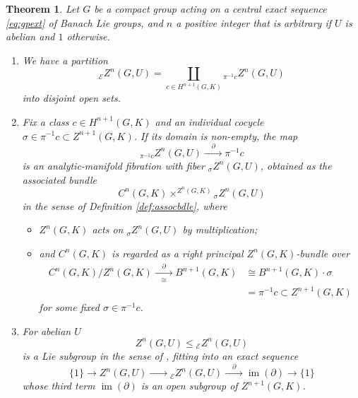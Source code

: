 \documentclass[10pt,a4paper]{amsart}
\numberwithin{equation}{section}
\newtheorem{Theorem}{Theorem}[section]
\newcommand\cE{{\mathcal E}}
\DeclareMathOperator{\im}{\mathrm{im}}
\begin{document}
\begin{Theorem}\label{th:relcocfiber}
 Let $G$ be a compact group acting on a central exact sequence \eqref{eq:gpext} of Banach Lie groups, and $n$ a positive integer that is arbitrary if $U$ is abelian and $1$ otherwise.
 \begin{enumerate}[$(1)$]\itemsep=0pt
 \item\label{item:relcocfiber1} We have a partition
 \begin{equation*}
 {}_{\cE}Z^n(G,U) = \coprod_{c\in H^{n+1}(G,K)}{}_{\pi^{-1}c} Z^n(G,U)
 \end{equation*}
 into disjoint open sets.
 \item\label{item:relcocfiber2} Fix a class $c\in H^{n+1}(G,K)$ and an individual cocycle $\sigma\in \pi^{-1}c\subset Z^{n+1}(G,K)$. If its domain is non-empty, the map
 \begin{equation}\label{eq:relznfibers}
 {}_{\pi^{-1}c}Z^n(G,U)\xrightarrow{\quad\partial\quad}\pi^{-1}c
 \end{equation}
 is an analytic-manifold fibration with fiber ${}_{\sigma}Z^n(G,U)$, obtained as the associated bundle
 \begin{equation*}
 C^{n}(G,K)\times^{Z^{n}(G,K)}{}_{\sigma}Z^n(G,U)
 \end{equation*}
 in the sense of Definition {\rm \ref{def:assocbdle}}, where
 \begin{itemize}\itemsep=0pt
 \item $Z^{n}(G,K)$ acts on ${}_{\sigma}Z^n(G,U)$ by multiplication;
 \item and $C^n(G,K)$ is regarded as a right principal $Z^n(G,K)$-bundle over
 \begin{align*}
 C^n(G,K)/Z^n(G,K) \xrightarrow[\cong]{\quad\partial\quad}
 B^{n+1}(G,K) &\cong B^{n+1}(G,K)\cdot \sigma\\
 &= \pi^{-1}c\subset Z^{n+1}(G,K)
 \end{align*}
 for some fixed $\sigma\in \pi^{-1}c$.
 \end{itemize}

 \item\label{item:relcocfiber3} For abelian $U$
 \begin{equation*}
 Z^n(G,U)
 \le
 {}_{\cE}Z^n(G,U)
 \end{equation*}
 is a Lie subgroup in the sense of {\rm\cite[\emph{Section}~III.1.3, \emph{Definition} 3]{bourb-lie-13}}, fitting into an exact sequence
 \begin{equation}\label{eq:zezim}
 \{1\}
 \to
 Z^n(G,U)
 \xrightarrow{\quad\phantom{\partial}\quad}
 {}_{\cE}Z^n(G,U)
 \xrightarrow{\quad\partial\quad}
 \im(\partial)
 \to
 \{1\}
 \end{equation}
 whose third term $\im(\partial)$ is an open subgroup of $Z^{n+1}(G,K)$.

 \end{enumerate}
\end{Theorem}
\end{document}
